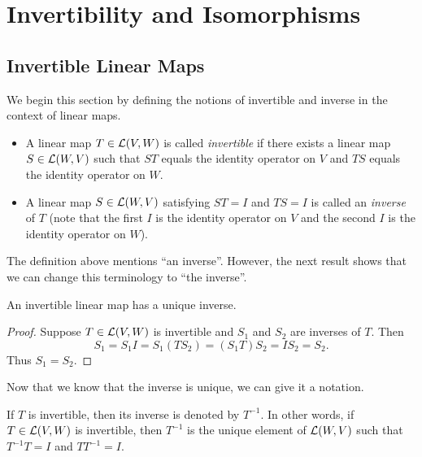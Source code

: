 \iftestbuild %
\setcounter{section}{3}\setcounter{theorem}{58}
\fi %
\section{Invertibility and Isomorphisms}

\subsection{Invertible Linear Maps}

We begin this section by defining the notions of invertible and inverse in the
context of linear maps.

\begin{definition}\label{ax:3.59}\leavevmode
\begin{itemize}
\item A linear map $T\in\mathcal{L}(V,W)$ is called \emph{invertible} if there exists
  a linear map $S\in\mathcal{L}(W,V)$ such that $ST$ equals the identity operator on
  $V$ and $TS$ equals the identity operator on $W$.
\item A linear map $S\in\mathcal{L}(W,V)$ satisfying $ST=I$ and $TS=I$ is called an
  \emph{inverse} of $T$ (note that the first $I$ is the identity operator on $V$
  and the second $I$ is the identity operator on $W$).
\end{itemize}
\end{definition}

The definition above mentions ``an inverse''. However, the next result shows
that we can change this terminology to ``the inverse''.

\begin{result}\label{ax:3.60}
An invertible linear map has a unique inverse.
\end{result}

\begin{proof}
Suppose $T\in\mathcal{L}(V,W)$ is invertible and $S_1$ and $S_2$ are inverses of $T$.
Then
\[ S_1 = S_1I = S_1(TS_2) = (S_1T)S_2 = IS_2 = S_2. \]
Thus $S_1=S_2$.
\end{proof}

Now that we know that the inverse is unique, we can give it a notation.

\begin{notation}[$T^{-1}$]\label{ax:3.61}
If $T$ is invertible, then its inverse is denoted by $T^{-1}$. In other words,
if $T\in\mathcal{L}(V,W)$ is invertible, then $T^{-1}$ is the unique element of
$\mathcal{L}(W,V)$ such that $T^{-1}T=I$ and $TT^{-1}=I$.
\end{notation}

